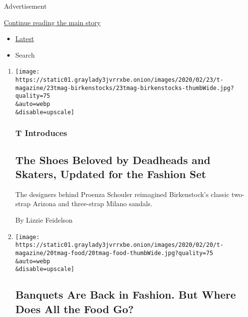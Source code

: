 Advertisement

\protect\hyperlink{after-mid1}{Continue reading the main story}

\begin{itemize}
\tightlist
\item
  \protect\hyperlink{stream-panel}{Latest}
\item
  Search
\end{itemize}

\begin{enumerate}
\def\labelenumi{\arabic{enumi}.}
\item
  \href{/2020/02/23/t-magazine/proenza-schouler-birkenstock.html}{}

  \texttt{[image: https://static01.graylady3jvrrxbe.onion/images/2020/02/23/t-magazine/23tmag-birkenstocks/23tmag-birkenstocks-thumbWide.jpg?quality=75\\\&auto=webp\\\&disable=upscale]}

  \hypertarget{t-introduces}{%
  \subsubsection{T Introduces}\label{t-introduces}}

  \hypertarget{the-shoes-beloved-by-deadheads-and-skaters-updated-for-the-fashion-set}{%
  \subsection{The Shoes Beloved by Deadheads and Skaters, Updated for
  the Fashion
  Set}\label{the-shoes-beloved-by-deadheads-and-skaters-updated-for-the-fashion-set}}

  The designers behind Proenza Schouler reimagined Birkenstock's classic
  two-strap Arizona and three-strap Milano sandals.

  By Lizzie Feidelson
\item
  \href{/2020/02/21/t-magazine/fashion-banquet-food-waste.html}{}

  \texttt{[image: https://static01.graylady3jvrrxbe.onion/images/2020/02/20/t-magazine/20tmag-food/20tmag-food-thumbWide.jpg?quality=75\\\&auto=webp\\\&disable=upscale]}

  \hypertarget{banquets-are-back-in-fashion-but-where-does-all-the-food-go}{%
  \subsection{Banquets Are Back in Fashion. But Where Does All the Food
  Go?}\label{banquets-are-back-in-fashion-but-where-does-all-the-food-go}}


\end{enumerate}
